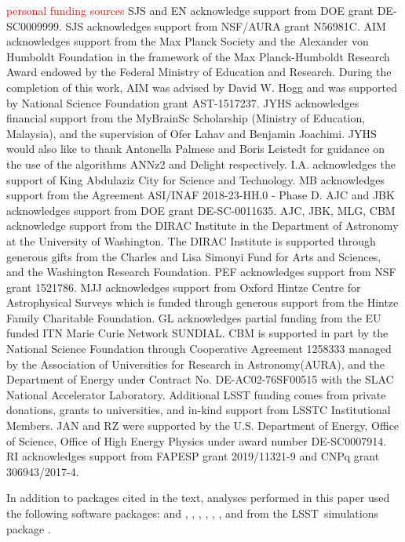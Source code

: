 \documentclass[\docopts]{\docclass}
\newcommand{\proj}[1]{\textsc{#1}}
\newcommand{\lsst}{\proj{LSST}}
\newcommand{\red}[1]{\textcolor{red}{#1}}
\begin{document}
{ \red{personal funding sources}}
SJS and EN acknowledge support from DOE grant DE-SC0009999.  SJS acknowledges support from NSF/AURA grant N56981C.
AIM acknowledges support from the Max Planck Society and the Alexander von Humboldt Foundation in the framework of the Max Planck-Humboldt Research Award endowed by the Federal Ministry of Education and Research.
During the completion of this work, AIM was advised by David W. Hogg and was supported by National Science Foundation grant AST-1517237.
JYHS acknowledges financial support from the MyBrainSc Scholarship (Ministry of Education, Malaysia), and the supervision of Ofer Lahav and Benjamin Joachimi.
JYHS would also like to thank Antonella Palmese and Boris Leistedt for guidance on the use of the algorithms ANNz2 and Delight respectively.
I.A. acknowledges the support of King Abdulaziz City for Science and Technology.
MB acknowledges support from the Agreement ASI/INAF 2018-23-HH.0 - Phase D.
AJC and JBK acknowledges support from DOE grant DE-SC-0011635. AJC, JBK, MLG, CBM acknowledge support from the DIRAC Institute in the Department of Astronomy at the University of Washington. The DIRAC Institute is supported through generous gifts from the Charles and Lisa Simonyi Fund for Arts and Sciences, and the Washington Research Foundation.
PEF acknowledges support from NSF grant 1521786.
MJJ acknowledges support from Oxford Hintze Centre for Astrophysical Surveys which is funded through generous support from the Hintze Family Charitable Foundation.
GL acknowledges partial funding from the EU funded ITN Marie Curie Network SUNDIAL.
CBM is supported in part by the National Science Foundation through Cooperative Agreement 1258333 managed by the Association of Universities for Research in Astronomy(AURA), and the Department of Energy under Contract No. DE-AC02-76SF00515 with the SLAC National Accelerator Laboratory. Additional LSST funding comes from private donations, grants to universities, and in-kind support from LSSTC Institutional Members.
JAN and RZ were supported by the U.S. Department of Energy, Office of Science, Office of High Energy Physics under award number DE-SC0007914.
RI acknowledges support from FAPESP grant 2019/11321-9 and CNPq grant 306943/2017-4.

In addition to packages cited in the text, analyses performed in this paper used the following software packages:  and  \citep{numpyscipy},  \citep{matplotlib},  \citep{seaborn},  \citep{minfunc},  \citep{Malz:qp, Malz:2018},  \citep{pyskynet}, and  from the \lsst\ simulations package \citep{lsstphotutils}.





\end{document}
